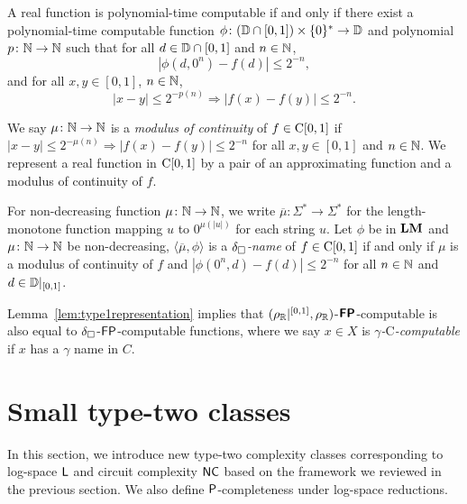 \documentclass[envcountsame,orivec,oribibl]{llncs}
\begin{document}
\begin{lemma}
 \label{lem:type1representation}
 A real function is polynomial-time computable if and only if
 there exist a polynomial-time computable function 
 $\phi \colon (\mathbb D \cap [0, 1]) \times \{0\} ^* \to \mathbb D$ and 
 polynomial $p \colon \mathbb N \to \mathbb N$ such that
 for all $d \in \mathbb D \cap [0,1]$ and $n \in \mathbb N$,
 \begin{equation}
  |\phi(d, 0^n) - f(d)| \le 2^{-n},
 \end{equation}
 and for all $x, y \in [0, 1]$, $n \in \mathbb N$,
 \begin{equation} 
  |x-y| \le 2^{-p(n)} \Rightarrow |f(x) - f(y)| \le 2^{-n}.
   \label{eq:modulus}
 \end{equation}
\end{lemma}

We say $\mu \colon \mathbb N \to \mathbb N$ is a {\em modulus of continuity} of $f \in \mathrm C[0,1]$
if $|x - y| \le 2^{-\mu(n)} \Rightarrow |f(x) - f(y)| \le 2^{-n}$ for all $x, y \in [0,1]$ and $n \in \mathbb N$.
We represent a real function in $\mathrm C[0,1]$ by a pair of
an approximating function and a modulus of continuity of $f$.

For non-decreasing function $\mu \colon \mathbb N \to \mathbb N$, 
we write $\overline \mu \colon \Sigma^* \to \Sigma^*$ for the length-monotone
function mapping $u$ to $0^{\mu(|u|)}$ for each string $u$.
Let $\phi$ be in $\mathbf{LM}$ and $\mu \colon \mathbb N \to \mathbb N$ be non-decreasing,
$\langle \overline{\mu}, \phi \rangle$ is a {\em $\delta _\square$-name} of $f \in \mathrm C[0,1]$
if and only if $\mu$ is a modulus of continuity of $f$
and $|\phi(0^n, d) - f(d)| \le 2^{-n}$ for all $n \in \mathbb N$ and $d \in \mathbb D|_{[0,1]}$.

Lemma~\ref{lem:type1representation} implies that
$(\rho _\mathbb R|^{[0,1]},\rho _\mathbb R)$-$\text{\bfseries \sffamily \upshape FP}$-computable is also equal to 
$\delta _\square$-$\mathsf{FP}$-computable functions,
where we say $x \in X$ is \emph{$\gamma$-$\mathrm C$-computable} if
$x$ has a $\gamma$ name in $C$.


\section{Small type-two classes}
\label{section:small-classes}

In this section, we introduce new type-two complexity classes
corresponding to log-space $\mathsf{L}$ and circuit complexity $\mathsf{NC}$
based on the framework we reviewed in the previous section.
We also define $\mathsf{P}$-completeness under log-space reductions.
\end{document}
